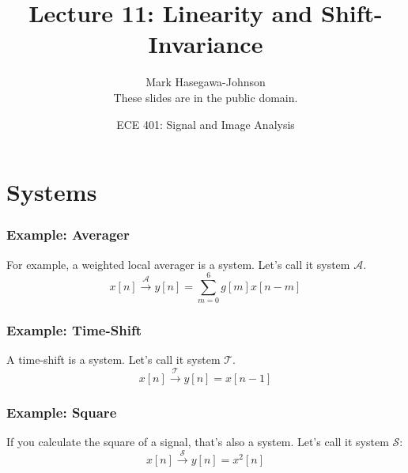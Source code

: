 \documentclass{beamer}
\title{Lecture 11: Linearity and Shift-Invariance}
\author{Mark Hasegawa-Johnson\\These slides are in the public domain.}
\date{ECE 401: Signal and Image Analysis}
\begin{document}
\begin{frame}
  \maketitle
\end{frame}

\begin{frame}
  \tableofcontents
\end{frame}

\section[Systems]{Systems}
\setcounter{subsection}{1}


\begin{frame}
  \frametitle{Example: Averager}

  For example, a weighted local averager is a system.  Let's call it
  system ${\mathcal A}$.
  \[
  x[n]\stackrel{\mathcal A}{\longrightarrow} y[n]=\sum_{m=0}^6 g[m] x[n-m]
  \]
\end{frame}

\begin{frame}
  \frametitle{Example: Time-Shift}

  A time-shift is a system.  Let's call it
  system ${\mathcal T}$.
  \[
  x[n]\stackrel{\mathcal T}{\longrightarrow} y[n]=x[n-1]
  \]
\end{frame}

\begin{frame}
  \frametitle{Example: Square}

  If you calculate the square of a signal, that's also a system.
  Let's call it system ${\mathcal S}$:
  \[
  x[n]\stackrel{\mathcal S}{\longrightarrow} y[n]=x^2[n]
  \]
  
\end{frame}
\end{document}
